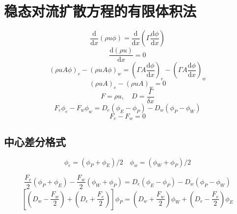 \section{稳态对流扩散方程的有限体积法}
\begin{equation}
  \frac{\mathrm{d} }{\mathrm{d} x}(\rho u\phi)
  =
  \frac{\mathrm{d} }{\mathrm{d} x}
  \left(
    \Gamma \frac{\mathrm{d} \phi}{\mathrm{d} x}
    \right)
\end{equation}
\begin{equation}
  \frac{\mathrm{d} (\rho u)}{\mathrm{d} x}
  =
  0
\end{equation}
\begin{equation}
  (\rho uA\phi)_{e}
  -
  (\rho uA\phi)_{w}
  =
  \left(
    \Gamma A\frac{\mathrm{d} \phi}{\mathrm{d} x}
  \right)_{e}
  -
  \left(
    \Gamma A\frac{\mathrm{d} \phi}{\mathrm{d} x}
  \right)_{w}
\end{equation}
\begin{equation}
  (\rho uA)_{e} 
  -
  (\rho uA)_{w}
  =
  0
\end{equation}
\begin{equation}
F = \rho u , \quad D = \frac{\Gamma}{\delta x}
\end{equation}
\begin{equation}
  F_{e}\phi_{e} - F_{w}\phi_{w}
  =
  D_{e}(\phi_{E}-\phi_{P})
  -
  D_{w}(\phi_{P}-\phi_{W})
\end{equation}
\begin{equation}
  F_{e} - F_{w} = 0
\end{equation}

\subsection{中心差分格式}
\begin{equation}
  \phi_{e} = (\phi_{P}+\phi_{E})/2
  \quad
  \phi_{w} = (\phi_{W}+\phi_{P})/2
\end{equation}

\begin{equation}
  \frac{F_{e}}{2}(\phi_{P}+\phi_{E})
 -
 \frac{F_{w}}{2}(\phi_{W}+\phi_{P})
  =
  D_{e}(\phi_{E}-\phi_{P})
  -
  D_{w}(\phi_{P}-\phi_{W})
\end{equation}
\begin{equation}
  \left[
    \left(
      D_{w} - \frac{F_{w}}{2}
    \right)
    +
    \left(
      D_{e} + \frac{F_{e}}{2}
    \right)
  \right]
  \phi_{P}
  =
    \left(
      D_{w} + \frac{F_{w}}{2}
    \right)
    \phi_{W}
    +
    \left(
      D_{e} - \frac{F_{e}}{2}
    \right)
    \phi_{E}
\end{equation}

